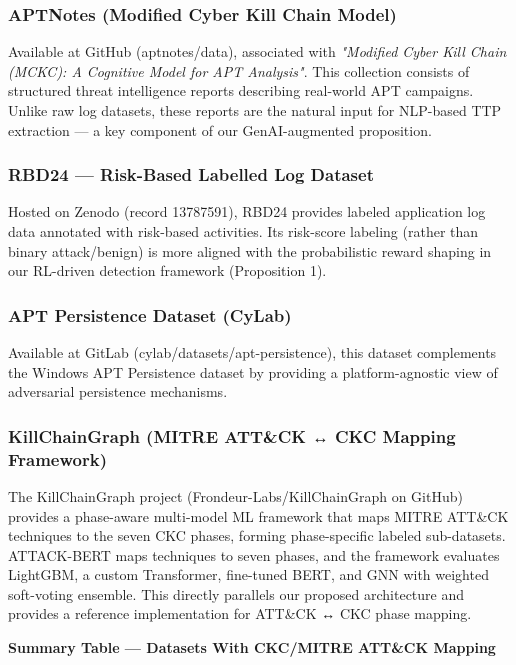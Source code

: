 \subsubsection{APTNotes (Modified Cyber Kill Chain Model)}

Available at GitHub (aptnotes/data), associated with \textit{"Modified Cyber Kill Chain (MCKC): A Cognitive Model for APT Analysis"}. This collection consists of structured threat intelligence reports describing real-world APT campaigns. Unlike raw log datasets, these reports are the natural input for NLP-based TTP extraction — a key component of our GenAI-augmented proposition.

\subsubsection{RBD24 — Risk-Based Labelled Log Dataset}

Hosted on Zenodo (record 13787591), RBD24 provides labeled application log data annotated with risk-based activities. Its risk-score labeling (rather than binary attack/benign) is more aligned with the probabilistic reward shaping in our RL-driven detection framework (Proposition 1).

\subsubsection{APT Persistence Dataset (CyLab)}

Available at GitLab (cylab/datasets/apt-persistence), this dataset complements the Windows APT Persistence dataset by providing a platform-agnostic view of adversarial persistence mechanisms.

\subsubsection{KillChainGraph (MITRE ATT\&CK ↔ CKC Mapping Framework)}

The KillChainGraph project (Frondeur-Labs/KillChainGraph on GitHub) provides a phase-aware multi-model ML framework that maps MITRE ATT\&CK techniques to the seven CKC phases, forming phase-specific labeled sub-datasets. ATTACK-BERT maps techniques to seven phases, and the framework evaluates LightGBM, a custom Transformer, fine-tuned BERT, and GNN with weighted soft-voting ensemble. This directly parallels our proposed architecture and provides a reference implementation for ATT\&CK ↔ CKC phase mapping.

\textbf{Summary Table — Datasets With CKC/MITRE ATT\&CK Mapping}

